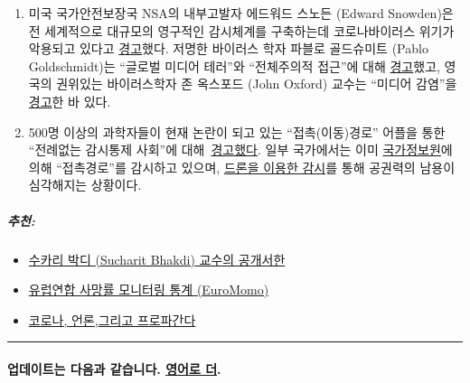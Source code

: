 \begin{enumerate}
{  백만 명}이 절대 빈곤층으로 전락할 전망이다.
\item
  미국 국가안전보장국 NSA의 내부고발자 에드워드 스노든 (Edward
  Snowden)은 전 세계적으로 대규모의 영구적인 감시체계를 구축하는데
  코로나바이러스 위기가 악용되고 있다고
  \href{https://www.youtube.com/watch?v=-pcQFTzck_c}{경고}했다. 저명한
  바이러스 학자 파블로 골드슈미트 (Pablo Goldschmidt)는 ``글로벌 미디어
  테러''와 ``전체주의적 접근''에 대해
  \href{https://www.rubikon.news/artikel/der-corona-totalitarismus}{경고}했고,
  영국의 권위있는 바이러스학자 존 옥스포드 (John Oxford) 교수는 ``미디어
  감염''을
  \href{https://novuscomms.com/2020/03/31/a-view-from-the-hvivo-open-orphan-orph-laboratory-professor-john-oxford/}{경고}한
  바 있다.~ 
\item
  500명 이상의 과학자들이 현재 논란이 되고 있는 ``접촉(이동)경로''
  어플을 통한 ``전례없는 감시통제 사회''에
  대해~\href{https://www.esat.kuleuven.be/cosic/sites/contact-tracing-joint-statement/}{경고했다}.
  일부 국가에서는 이미
  \href{https://www.jewishpress.com/news/the-courts/state-to-high-court-even-more-shin-bet-involvement-in-fighting-the-coronavirus/2020/04/14/}{국가정보원}에
  의해 ``접촉경로''를 감시하고 있으며,
  \href{https://off-guardian.org/2020/04/25/50-headlines-darker-more-of-the-new-normal/}{드론을
  이용한 감시}를 통해 공권력의 남용이 심각해지는 상황이다. 
\end{enumerate}

\hypertarget{uxcd94uxcc9c}{%
\subparagraph{\texorpdfstring{\textbf{추천}:}{추천:}}\label{uxcd94uxcc9c}}

\begin{itemize}
\tightlist
\item
  \href{https://swprs.org/open-letter-from-professor-sucharit-bhakdi-to-german-chancellor-dr-angela-merkel/}{수카리
  박디 (Sucharit Bhakdi) 교수의 공개서한}
\item
  \href{https://www.euromomo.eu/}{유럽연합 사망률 모니터링 통계
  (EuroMomo)}
\item
  \href{https://swprs.org/corona-media-propaganda/}{코로나,
  언론,}\href{https://swprs.org/corona-media-propaganda/}{그리고
  프로파간다}
\end{itemize}

\begin{center}\rule{0.5\linewidth}{\linethickness}\end{center}

\hypertarget{uxc5c5uxb370uxc774uxd2b8uxb294-uxb2e4uxc74cuxacfc-uxac19uxc2b5uxb2c8uxb2e4-uxc601uxc5b4uxb85c-uxb354}{%
\paragraph{\texorpdfstring{업데이트는 다음과 같습니다.
\href{https://swprs.org/a-swiss-doctor-on-covid-19/}{영어로
더}.}{업데이트는 다음과 같습니다. 영어로 더.}}\label{uxc5c5uxb370uxc774uxd2b8uxb294-uxb2e4uxc74cuxacfc-uxac19uxc2b5uxb2c8uxb2e4-uxc601uxc5b4uxb85c-uxb354}}

